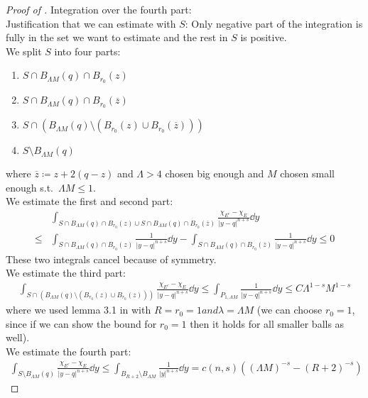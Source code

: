 \begin{proof}[Proof of ]
	Integration over the fourth part: \\
	Justification that we can estimate with \( S \): Only negative part of the integration
	is fully in the set we want to estimate and the rest in \( S \) is positive. \\
	We split \( S \) into four parts:
	\begin{enumerate}[label = \roman*)]
		\item \( S \cap B_{\Lambda M} (q) \cap B_{r_0}(z) \)
		\item \( S \cap B_{\Lambda M} (q) \cap B_{r_0}(\overline{z}) \)
		\item \( S \cap (B_{\Lambda M} (q)\setminus (B_{r_0}(z) \cup
		      B_{r_0}(\overline{z}))) \)
		\item \( S \setminus B_{\Lambda M} (q) \)
	\end{enumerate}
	where \( \overline{z}\coloneqq z + 2(q - z) \) and \( \Lambda > 4 \) chosen big enough
	and \( M \) chosen small enough s.t.\ \( \Lambda M \leq 1 \). \\
	We estimate the first and second part:
	\begin{align*}
		     & \int_{S \cap B_{\Lambda M} (q) \cap B_{r_0}(z) \cup S \cap B_{\Lambda M} (q) \cap B_{r_0}(\overline{z})} \frac{\chi_{E^c} - \chi_E}{\lvert y - q\rvert^{n + s}} \dd{y} \\
		\leq & \int_{S \cap B_{\Lambda M} (q) \cap B_{r_0}(z)} \frac{1}{\lvert y - q\rvert^{n + s}} \dd{y} - \int_{S \cap B_{\Lambda M} (q) \cap B_{r_0}(\overline{z})} \frac{1}{\lvert y - q\rvert^{n + s}} \dd{y} \leq 0
	\end{align*}
	These two integrals cancel because of symmetry. \\
	We estimate the third part:
	\begin{gather*}
		\int_{S \cap (B_{\Lambda M} (q)\setminus (B_{r_0}(z) \cup B_{r_0}(z)))}\frac{\chi_{E^c} - \chi_E}{\lvert y - q\rvert^{n + s}} \dd{y} \leq \int_{P_{1, \Lambda M}} \frac{1}{\lvert y - q\rvert^{n + s}} \dd{y} \leq C \Lambda^{1 - s} M^{1 - s}
	\end{gather*}
	where we used lemma 3.1 in \cite{Dipierro2016} with \( R = r_0 = 1 and \lambda =
	\Lambda M \) (we can choose \( r_0 = 1 \), since if we can show the bound for \( r_0 =
	1 \) then it holds for all smaller balls as well). \\
	We estimate the fourth part:
	\begin{gather*}
		\int_{S\setminus B_{\Lambda M} (q)} \frac{\chi_{E^c} - \chi_E}{\lvert y - q\rvert^{n + s}} \dd{y} \leq \int_{B_{R + 2}\setminus B_{\Lambda M}} \frac{1}{\lvert y\rvert^{n + s}} \dd{y} = c(n, s)((\Lambda M)^{- s} - (R + 2)^{- s})

\end{gather*}
\end{proof}
